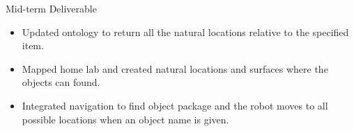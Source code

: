 \documentclass[aspectratio=169]{beamer}
\begin{document}

\begin{frame}{Mid-term Deliverable}
      \begin{itemize}
        \item Updated ontology to return all the natural locations relative to the specified item.
        \item Mapped home lab and created natural locations and surfaces where the objects can found.
        \item Integrated navigation to find object package and the robot moves to all possible locations when an object name is given.
    \end{itemize}
    \vfill
\end{frame}
\end{document}

